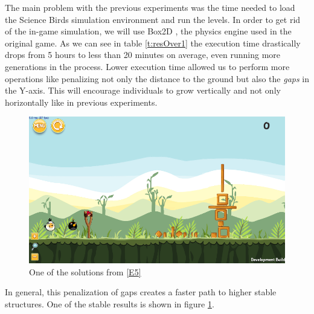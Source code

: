 \documentclass[sigconf]{acmart}
\begin{document}
The main problem with the previous experiments was the time needed to
load the Science Birds simulation environment and run the levels.
In order to get rid of the in-game simulation, we will use Box2D
\cite{catto2011box2d}\cite{box2d}, the physics engine used in the original game.
As we can see in table \ref{t:resOver1} the execution time drastically
drops from 5 hours to less than 20 minutes on average, even running
more generations in the process.
Lower execution time allowed us to perform more operations like penalizing
not only the distance to the ground but also the \textit{gaps} in the
Y-axis.
This will encourage individuals to grow vertically and not only horizontally
like in previous experiments.
%
 \begin{figure}
 	\centering
 	\includegraphics[scale=0.3]{E5.png}
 	\caption{One of the solutions from \ref{E5}}\label{f:e5}
      \end{figure}

In general, this penalization of gaps creates a faster path to higher stable
structures.
One of the stable results is shown in figure \ref{f:e5}.
\end{document}

